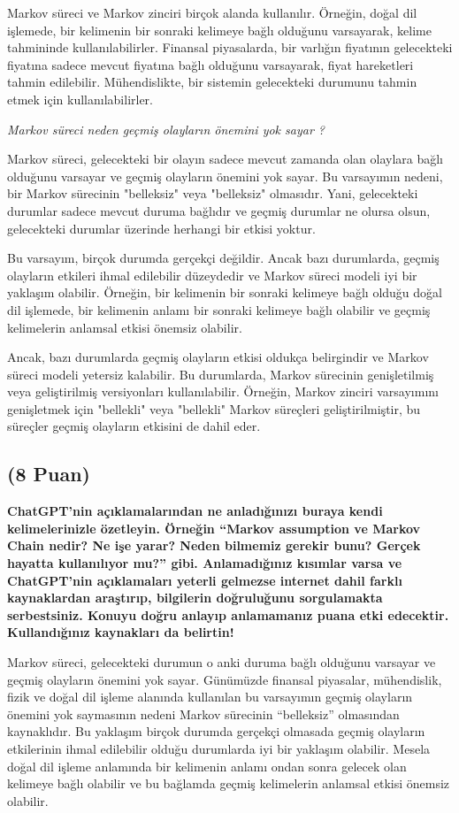 \documentclass[11pt]{article}
\begin{document}
Markov süreci ve Markov zinciri birçok alanda kullanılır. Örneğin, doğal dil işlemede, bir kelimenin bir sonraki kelimeye bağlı olduğunu varsayarak, kelime tahmininde kullanılabilirler. Finansal piyasalarda, bir varlığın fiyatının gelecekteki fiyatına sadece mevcut fiyatına bağlı olduğunu varsayarak, fiyat hareketleri tahmin edilebilir. Mühendislikte, bir sistemin gelecekteki durumunu tahmin etmek için kullanılabilirler.

\textit{Markov süreci neden geçmiş olayların önemini yok sayar ?}

Markov süreci, gelecekteki bir olayın sadece mevcut zamanda olan olaylara bağlı olduğunu varsayar ve geçmiş olayların önemini yok sayar. Bu varsayımın nedeni, bir Markov sürecinin "belleksiz" veya "belleksiz" olmasıdır. Yani, gelecekteki durumlar sadece mevcut duruma bağlıdır ve geçmiş durumlar ne olursa olsun, gelecekteki durumlar üzerinde herhangi bir etkisi yoktur.

Bu varsayım, birçok durumda gerçekçi değildir. Ancak bazı durumlarda, geçmiş olayların etkileri ihmal edilebilir düzeydedir ve Markov süreci modeli iyi bir yaklaşım olabilir. Örneğin, bir kelimenin bir sonraki kelimeye bağlı olduğu doğal dil işlemede, bir kelimenin anlamı bir sonraki kelimeye bağlı olabilir ve geçmiş kelimelerin anlamsal etkisi önemsiz olabilir.

Ancak, bazı durumlarda geçmiş olayların etkisi oldukça belirgindir ve Markov süreci modeli yetersiz kalabilir. Bu durumlarda, Markov sürecinin genişletilmiş veya geliştirilmiş versiyonları kullanılabilir. Örneğin, Markov zinciri varsayımını genişletmek için "bellekli" veya "bellekli" Markov süreçleri geliştirilmiştir, bu süreçler geçmiş olayların etkisini de dahil eder.


\subsection{(8 Puan)} \textbf{ChatGPT’nin açıklamalarından ne anladığınızı buraya kendi kelimelerinizle özetleyin. Örneğin ``Markov assumption ve Markov Chain nedir? Ne işe yarar? Neden bilmemiz gerekir bunu? Gerçek hayatta kullanılıyor mu?'' gibi. Anlamadığınız kısımlar varsa ve ChatGPT’nin açıklamaları yeterli gelmezse internet dahil farklı kaynaklardan araştırıp, bilgilerin doğruluğunu sorgulamakta serbestsiniz. Konuyu doğru anlayıp anlamamanız puana etki edecektir. Kullandığınız kaynakları da belirtin!}

Markov süreci, gelecekteki durumun o anki duruma bağlı olduğunu varsayar ve geçmiş olayların önemini yok sayar. Günümüzde finansal piyasalar, mühendislik, fizik ve doğal dil işleme alanında kullanılan bu varsayımın geçmiş olayların önemini yok saymasının nedeni Markov sürecinin “belleksiz” olmasından kaynaklıdır. Bu yaklaşım birçok durumda gerçekçi olmasada geçmiş olayların etkilerinin ihmal edilebilir olduğu durumlarda iyi bir yaklaşım olabilir. Mesela doğal dil işleme anlamında bir kelimenin anlamı ondan sonra gelecek olan kelimeye bağlı olabilir ve bu bağlamda geçmiş kelimelerin anlamsal etkisi önemsiz olabilir.
\end{document}
